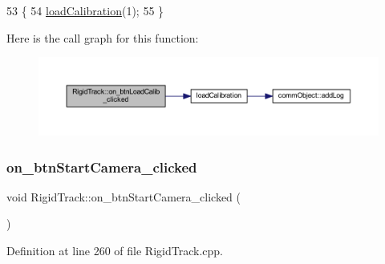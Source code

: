 \begin{DoxyCode}
53 \{
54     \hyperlink{main_8cpp_ad39626702ff983d5fdab4b703bfaf964}{loadCalibration}(1);
55 \}
\end{DoxyCode}
Here is the call graph for this function\+:
\nopagebreak
\begin{figure}[H]
\begin{center}
\leavevmode
\includegraphics[width=350pt]{class_rigid_track_a2224d3f6d923a1c7bad356f49d7a4124_cgraph}
\end{center}
\end{figure}
\mbox{\label{class_rigid_track_a2f226856e28868c8bb1854fa16531f60}} 
\subsubsection{\texorpdfstring{on\+\_\+btn\+Start\+Camera\+\_\+clicked}{on\_btnStartCamera\_clicked}}
{\footnotesize\ttfamily void Rigid\+Track\+::on\+\_\+btn\+Start\+Camera\+\_\+clicked (\begin{DoxyParamCaption}{ }\end{DoxyParamCaption})\hspace{0.3cm}{\ttfamily [slot]}}



Definition at line 260 of file Rigid\+Track.\+cpp.


